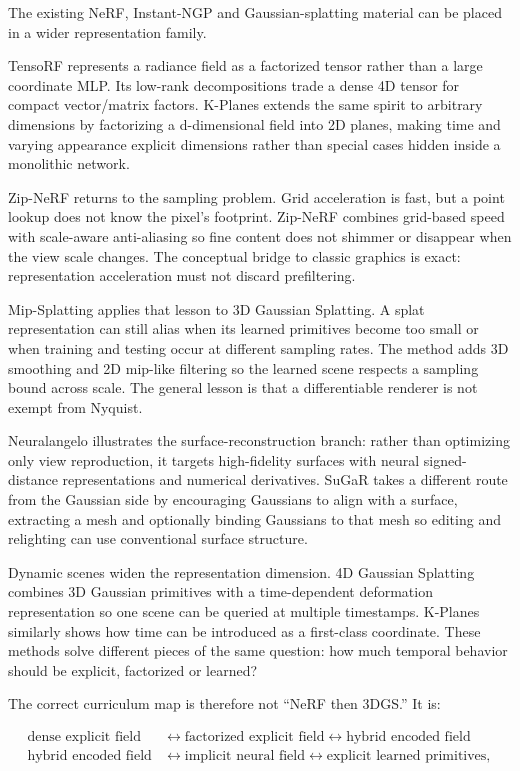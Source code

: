 The existing NeRF, Instant-NGP and Gaussian-splatting material can be placed in a wider representation family.

TensoRF represents a radiance field as a factorized tensor rather than a large coordinate MLP. Its low-rank decompositions trade a dense 4D tensor for compact vector/matrix factors. K-Planes extends the same spirit to arbitrary dimensions by factorizing a d-dimensional field into 2D planes, making time and varying appearance explicit dimensions rather than special cases hidden inside a monolithic network.

Zip-NeRF returns to the sampling problem. Grid acceleration is fast, but a point lookup does not know the pixel's footprint. Zip-NeRF combines grid-based speed with scale-aware anti-aliasing so fine content does not shimmer or disappear when the view scale changes. The conceptual bridge to classic graphics is exact: representation acceleration must not discard prefiltering.

Mip-Splatting applies that lesson to 3D Gaussian Splatting. A splat representation can still alias when its learned primitives become too small or when training and testing occur at different sampling rates. The method adds 3D smoothing and 2D mip-like filtering so the learned scene respects a sampling bound across scale. The general lesson is that a differentiable renderer is not exempt from Nyquist.

Neuralangelo illustrates the surface-reconstruction branch: rather than optimizing only view reproduction, it targets high-fidelity surfaces with neural signed-distance representations and numerical derivatives. SuGaR takes a different route from the Gaussian side by encouraging Gaussians to align with a surface, extracting a mesh and optionally binding Gaussians to that mesh so editing and relighting can use conventional surface structure.

Dynamic scenes widen the representation dimension. 4D Gaussian Splatting combines 3D Gaussian primitives with a time-dependent deformation representation so one scene can be queried at multiple timestamps. K-Planes similarly shows how time can be introduced as a first-class coordinate. These methods solve different pieces of the same question: how much temporal behavior should be explicit, factorized or learned?

The correct curriculum map is therefore not ``NeRF then 3DGS.'' It is:

\[\begin{aligned}\text{dense explicit field} &\leftrightarrow \text{factorized explicit field} \leftrightarrow \text{hybrid encoded field} \\\text{hybrid encoded field} &\leftrightarrow \text{implicit neural field} \leftrightarrow \text{explicit learned primitives},\end{aligned}\]

